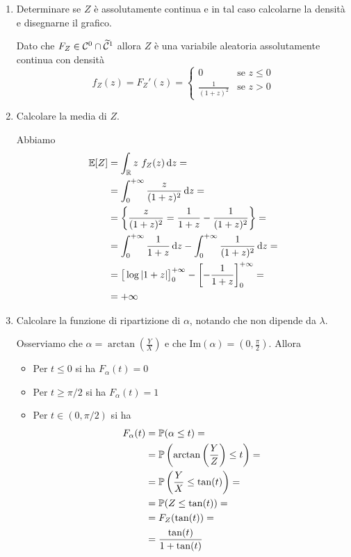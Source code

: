 \begin{enumerate}
\item Determinare se $Z$ è assolutamente continua e in tal caso calcolarne la densità e disegnarne il grafico.

Dato che $F_Z\in\mathcal{C}^0\cap\widetilde{\mathcal{C}}^1$ allora $Z$ è una variabile aleatoria assolutamente continua con densità
\[
f_Z(z)=F_Z'(z)=
\begin{cases}
0 &\text{se }z\leq 0 \\
\displaystyle\frac{1}{(1+z)^2} &\text{se }z>0
\end{cases}
\]

\item Calcolare la media di $Z$.

Abbiamo
\begin{gather*}
\begin{aligned}
\mathbb{E}[Z]&=\int_{\mathbb{R}} z\ f_Z(z)\, \mathrm{d} z=\\
&=\int_{0}^{+\infty}\frac{z}{(1+z)^2}\, \mathrm{d} z=\\
&=\left\{ \frac{z}{(1+z)^2}=\frac{1}{1+z}-\frac{1}{(1+z)^2}  \right\}=\\
&=\int_{0}^{+\infty}\frac{1}{1+z}\, \mathrm{d} z-\int_{0}^{+\infty}\frac{1}{(1+z)^2}\, \mathrm{d} z=\\
&=\big[\log |1+z|  \big]_0^{+\infty}-\left[-\frac{1}{1+z}  \right]_0^{+\infty}=\\
&=+\infty
\end{aligned}
\end{gather*}

\item Calcolare la funzione di ripartizione di $\alpha$, notando che non dipende da $\lambda$.

Osserviamo che $\displaystyle\alpha=\arctan\left(\frac{Y}{X}\right)$ e che $\displaystyle \text{Im}(\alpha)=\left(0,\frac{\pi}{2}\right)$. Allora
\begin{itemize}
\item Per $t\leq 0$ si ha $F_\alpha(t)=0$
\item Per $t\geq\pi/2$ si ha $F_\alpha(t)=1$
\item Per $t\in(0,\pi/2)$ si ha
\begin{gather*}
\begin{aligned}
F_\alpha(t)&=\mathbb{P}(\alpha\leq t)=\\
&=\mathbb{P}\left(\arctan\left(\frac{Y}{Z}\right)\leq t\right)=\\
&=\mathbb{P}\left(\frac{Y}{X}\leq\tan(t)\right)=\\
&=\mathbb{P}(Z\leq\tan(t))=\\
&=F_Z(\tan(t))=\\
&=\frac{\tan(t)}{1+\tan(t)}
\end{aligned}
\end{gather*}
\end{itemize}


\end{enumerate}
